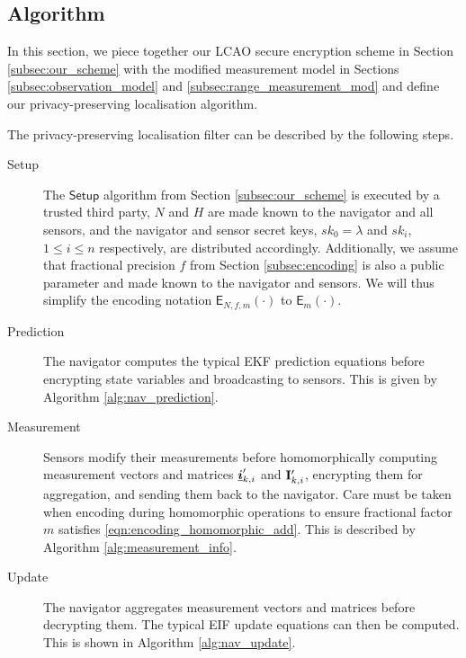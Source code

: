 \documentclass[twocolumn]{autart}
\begin{document}
% 
% 

\subsection{Algorithm} \label{subsec:algorithm}
In this section, we piece together our LCAO secure encryption scheme in Section \ref{subsec:our_scheme} with the modified measurement model in Sections \ref{subsec:observation_model} and \ref{subsec:range_measurement_mod} and define our privacy-preserving localisation algorithm.

The privacy-preserving localisation filter can be described by the following steps.
\begin{description}
    \item[Setup] The $\mathsf{Setup}$ algorithm from Section \ref{subsec:our_scheme} is executed by a trusted third party, $N$ and $H$ are made known to the navigator and all sensors, and the navigator and sensor secret keys, $sk_0=\lambda$ and $sk_i$, $1 \leq i \leq n$ respectively, are distributed accordingly. Additionally, we assume that fractional precision $f$ from Section \ref{subsec:encoding} is also a public parameter and made known to the navigator and sensors. We will thus simplify the encoding notation $\mathsf{E}_{N,f,m}(\cdot)$ to $\mathsf{E}_{m}(\cdot)$.

    \item[Prediction] The navigator computes the typical EKF prediction equations before encrypting state variables and broadcasting to sensors. This is given by Algorithm \ref{alg:nav_prediction}.

    \item[Measurement] Sensors modify their measurements before homomorphically computing measurement vectors and matrices ${\boldsymbol{\underline{i}}}'_{k,i}$ and ${{\mathbf{I}}}'_{k,i}$, encrypting them for aggregation, and sending them back to the navigator. Care must be taken when encoding during homomorphic operations to ensure fractional factor $m$ satisfies \eqref{eqn:encoding_homomorphic_add}. This is described by Algorithm \ref{alg:measurement_info}.

    \item[Update] The navigator aggregates measurement vectors and matrices before decrypting them. The typical EIF update equations can then be computed. This is shown in Algorithm \ref{alg:nav_update}.
\end{description}
\end{document}
